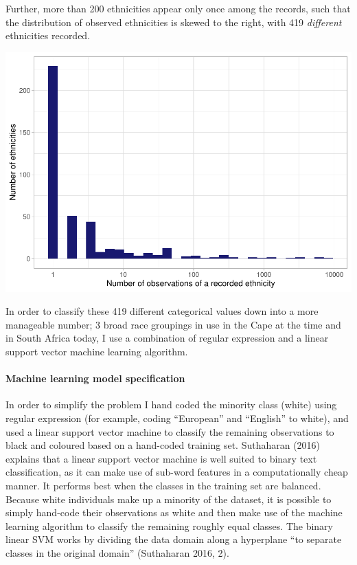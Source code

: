 \documentclass[fleqn,10pt,lineno]{wlpeerj} %
\begin{document}
Further, more than 200 ethnicities appear only once among the records, such that the distribution of observed ethnicities is skewed to the right, with 419 \emph{different} ethnicities recorded.

\includegraphics{spanish-flu-mortality_bookdown_files/figure-latex/unnamed-chunk-2-1.pdf}

In order to classify these 419 different categorical values down into a more manageable number; 3 broad race groupings in use in the Cape at the time and in South Africa today, I use a combination of regular expression and a linear support vector machine learning algorithm.

\hypertarget{machine-learning-model-specification}{%
\paragraph{Machine learning model specification}\label{machine-learning-model-specification}}

In order to simplify the problem I hand coded the minority class (white) using regular expression (for example, coding ``European'' and ``English'' to white), and used a linear support vector machine to classify the remaining observations to black and coloured based on a hand-coded training set. Suthaharan (2016) explains that a linear support vector machine is well suited to binary text classification, as it can make use of sub-word features in a computationally cheap manner. It performs best when the classes in the training set are balanced. Because white individuals make up a minority of the dataset, it is possible to simply hand-code their observations as white and then make use of the machine learning algorithm to classify the remaining roughly equal classes. The binary linear SVM works by dividing the data domain along a hyperplane ``to separate classes in the original domain'' (Suthaharan 2016, 2).
\end{document}
